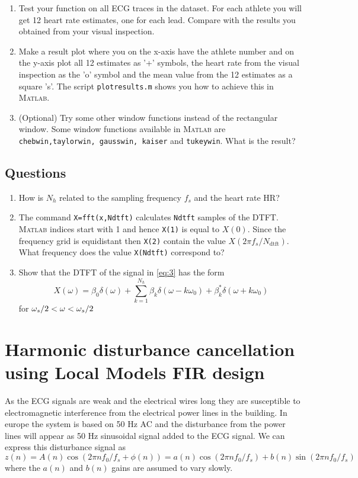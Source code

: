 \documentclass[12pt]{article}
\begin{document}
\begin{enumerate}
\begin{description}
  \end{description}
\item Test your function on all ECG traces in the dataset. For each
  athlete you will get 12 heart rate estimates, one for each
  lead. Compare with the results you obtained from your visual inspection.  
\item Make a result plot where you on the x-axis have the athlete number and on the y-axis plot all 12 estimates as '+' symbols, the heart rate from the visual inspection as the 'o' symbol and the mean value from the 12 estimates as a square 's'.  The script \texttt{plotresults.m} shows you how to achieve this in \textsc{Matlab}.
\item (Optional) Try some other window functions instead of the rectangular window. Some window functions available in \textsc{Matlab} are \texttt{chebwin,taylorwin, gausswin, kaiser} and  \texttt{tukeywin}. What is the result? 
\end{enumerate}

\subsection{Questions}
\label{sec:questions}
\begin{enumerate}
\item How is $N_h$ related to the sampling frequency $f_s$ and the heart rate $\mathrm{HR}$?
\item The command \texttt{X=fft(x,Ndtft)} calculates \texttt{Ndtft} samples of the DTFT. \textsc{Matlab} indices start with 1 and hence \texttt{X(1)} is equal to $X(0)$. Since the frequency grid is equidistant then \texttt{X(2)} contain the value $X(2\pi f_s/N_\text{dtft})$. What frequency does the value \texttt{X(Ndtft)} correspond to? 
 \item Show that the DTFT of the signal in \eqref{eq:3} has the form 
  \begin{equation}
    \label{eq:6}
    X(\omega) = \beta_0 \delta(\omega)  + \sum_{k=1}^{N_h} \beta_k \delta(\omega-k \omega_0)  + \beta^*_k \delta(\omega+k \omega_0)  
  \end{equation}
  for $\-\omega_s/2<\omega<\omega_s/2$
\end{enumerate}

\section{Harmonic disturbance cancellation using Local Models FIR design}
\label{sec:harm-dist-canc}
As the ECG signals are weak and the electrical wires long they are
susceptible to electromagnetic interference from the electrical power
lines in the building. In europe the system is based on 50 Hz AC and
the disturbance from the power lines will appear as 50 Hz sinusoidal
signal added to the ECG signal. We can express this disturbance signal
as
\begin{equation}
  \label{eq:14}
  z(n) = A(n) \cos(2\pi n f_0/f_s + \phi(n) )  =  a(n) \cos(2\pi n
  f_0/f_s) +  b(n) \sin(2\pi n f_0/f_s) 
\end{equation}
where the $a(n)$ and $b(n)$ gains are assumed to vary slowly.
\end{document}
